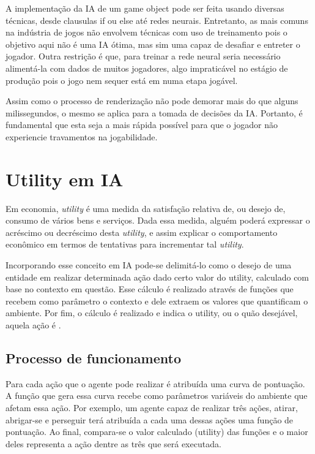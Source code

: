 \documentclass[12pt, 
openright, 
oneside, 
a4paper,    
brazil]{facom-ufu-abntex2}
\begin{document}
A implementação da IA de um game object pode ser feita usando diversas técnicas, desde clausulas if ou else até redes neurais. Entretanto, as mais comuns na indústria de jogos não envolvem técnicas com uso de treinamento pois o objetivo aqui não é uma IA ótima, mas sim uma capaz de desafiar e entreter o jogador. Outra restrição é que, para treinar a rede neural seria necessário alimentá-la com dados de muitos jogadores, algo impraticável no estágio de produção pois o jogo nem sequer está em numa etapa jogável.

Assim como o processo de renderização não pode demorar mais do que alguns milissegundos, o mesmo se aplica para a tomada de decisões da IA. Portanto, é fundamental que esta seja a mais rápida possível para que o jogador não experiencie travamentos na jogabilidade.

\section{Utility em IA}

Em economia, \textit{utility} é uma medida da satisfação relativa de, ou desejo de, consumo de vários bens e serviços. Dada essa medida, alguém poderá expressar o acréscimo ou decréscimo desta \textit{utility}, e assim explicar o comportamento econômico em termos de tentativas para incrementar tal \textit{utility}.

Incorporando esse conceito em IA pode-se delimitá-lo como o desejo de uma entidade em realizar determinada ação dado certo valor do utility, calculado com base no contexto em questão. Esse cálculo é realizado através de funções que recebem como parâmetro o contexto e dele extraem os valores que quantificam o ambiente. Por fim, o cálculo é realizado e indica o utility, ou o quão desejável,  aquela ação é \cite{UtilityAI}.



\subsection{Processo de funcionamento}
Para cada ação que o agente pode realizar é atribuída uma curva de pontuação. A função que gera essa curva recebe como parâmetros variáveis do ambiente que afetam essa ação. Por exemplo, um agente capaz de realizar três ações, atirar, abrigar-se e perseguir terá atribuída a cada uma dessas ações uma função de pontuação. Ao final, compara-se o valor calculado (utility) das funções e o maior deles representa a ação dentre as três que será executada.
\end{document}
